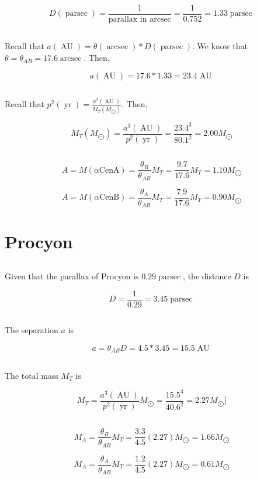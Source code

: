 \documentclass[11pt]{scrartcl}
\newcommand{\mearth}{M_{\bigodot}}
\DeclareMathOperator{\AU}{AU}
\DeclareMathOperator{\arcsec}{arcsec}
\DeclareMathOperator{\parsec}{parsec}
\DeclareMathOperator{\yr}{yr}
\begin{document}
\[D(\parsec) = \frac{1}{\text{parallax in arcsec}} = \frac{1}{0.752} = 1.33\parsec\]

\subsection{}

Recall that $a(\AU) = \theta(\arcsec) * D(\parsec)$. We know that $\theta = \theta_{AB} = 17.6 \arcsec$. Then,

\[a(\AU) = 17.6 * 1.33 = 23.4 \AU\]

\subsection{}

Recall that $p^2(\yr) = \frac{a^3(\AU)}{M_T(\mearth)}$. Then,

\[M_T(\mearth) = \frac{a^3(\AU)}{p^2(\yr)} = \frac{23.4^3}{80.1^2} = 2.00\mearth\]

\subsection{}

\[A = M(\alpha\text{CenA}) = \frac{\theta_B}{\theta_{AB}}M_T = \frac{9.7}{17.6}M_T = 1.10\mearth\]

\[A = M(\alpha\text{CenB}) = \frac{\theta_A}{\theta_{AB}}M_T = \frac{7.9}{17.6}M_T = 0.90\mearth\]


\section{Procyon}

\subsection{}

Given that the parallax of Procyon is $0.29 \parsec$, the distance $D$ is

\[D = \frac{1}{0.29} = 3.45\parsec\]

\subsection{}

The separation $a$ is

\[a = \theta_{AB}D = 4.5 * 3.45 = 15.5\AU\]

\subsection{}

The total mass $M_T$ is

\[M_T = \frac{a^3(\AU)}{p^2(\yr)}\mearth = \frac{15.5^3}{40.6^2} = 2.27\mearth]\]

\subsection{}

\[M_A = \frac{\theta_B}{\theta_{AB}} M_T = \frac{3.3}{4.5} (2.27)\mearth = 1.66\mearth\]

\[M_A = \frac{\theta_A}{\theta_{AB}} M_T = \frac{1.2}{4.5} (2.27)\mearth = 0.61\mearth\]
\end{document}
